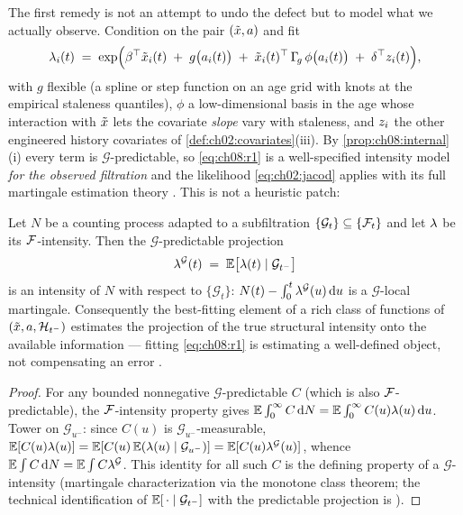 The first remedy is not an attempt to undo the defect but to model what
we actually observe. Condition on the pair $(\tilde{x}, a)$
and fit
\begin{equation}\label{eq:ch08:r1}
\lambda_i(t)
 \;=\;
 \exp\!\Big(
 \beta^{\top} \tilde{x}_i(t)
 \;+\; g\big(a_i(t)\big)
 \;+\; \tilde{x}_i(t)^{\top}\, \Gamma_{\!g}\, \phi\big(a_i(t)\big)
 \;+\; \delta^{\top} z_i(t)
 \Big),
\end{equation}
with $g$ flexible (a spline or step function on an age grid with knots
at the empirical staleness quantiles), $\phi$ a low-dimensional basis in
the age whose interaction with $\tilde{x}$ lets the covariate
\emph{slope} vary with staleness, and $z_i$ the other engineered
history covariates of \cref{def:ch02:covariates}(iii). By
\cref{prop:ch08:internal}(i) every term is $\mathcal{G}$-predictable, so
\cref{eq:ch08:r1} is a well-specified intensity model \emph{for the
observed filtration} and the likelihood \cref{eq:ch02:jacod} applies
with its full martingale estimation theory \citep{abgk1993,
andersengill1982}. This is not a heuristic patch:

\begin{proposition}\label{prop:ch08:projection}
Let $N$ be a counting process adapted to a subfiltration
$\{\mathcal{G}_t\} \subseteq \{\mathcal{F}_{t}\}$ and let $\lambda$ be its
$\mathcal{F}$-intensity. Then the $\mathcal{G}$-predictable projection
\[
\lambda^{\mathcal{G}}(t) \;=\; \mathbb{E}\big[\lambda(t) \mid \mathcal{G}_{t^-}\big]
\]
is an intensity of $N$ with respect to $\{\mathcal{G}_t\}$: $N(t) -
\int_0^t \lambda^{\mathcal{G}}(u)\,\mathrm{d} u$ is a $\mathcal{G}$-local
martingale. Consequently the best-fitting element of a rich class of
functions of $(\tilde{x}, a, \mathcal{H}_{t^-})$ estimates the
projection of the true structural intensity onto the available
information --- fitting \cref{eq:ch08:r1} is estimating a well-defined
object, not compensating an error \citep[Ch.~14]{daley2008}
\citep[II.4]{abgk1993}.
\end{proposition}

\begin{proof}
For any bounded nonnegative $\mathcal{G}$-predictable $C$ (which is also
$\mathcal{F}$-predictable), the $\mathcal{F}$-intensity property gives
$\mathbb{E}\int_0^\infty C\,\mathrm{d} N = \mathbb{E}\int_0^\infty C(u)\lambda(u)\,\mathrm{d} u$. Tower on
$\mathcal{G}_{u^-}$: since $C(u)$ is $\mathcal{G}_{u^-}$-measurable,
$\mathbb{E}[C(u)\lambda(u)] = \mathbb{E}[C(u)\,\mathbb{E}(\lambda(u)\mid\mathcal{G}_{u^-})] =
\mathbb{E}[C(u)\lambda^{\mathcal{G}}(u)]$, whence $\mathbb{E}\int C\,\mathrm{d} N =
\mathbb{E}\int C\lambda^{\mathcal{G}}$. This identity for all such $C$ is the
defining property of a $\mathcal{G}$-intensity (martingale
characterization via the monotone class theorem; the technical
identification of $\mathbb{E}[\,\cdot \mid \mathcal{G}_{t^-}]$ with the
predictable projection is \citealp[Ch.~14]{daley2008}).
\end{proof}

